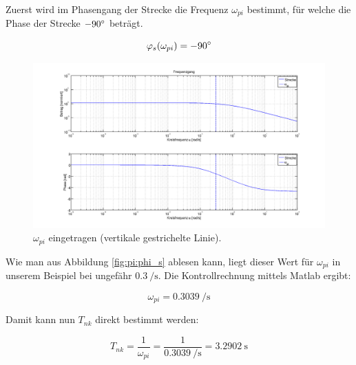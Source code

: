 Zuerst wird im Phasengang der Strecke die Frequenz $\omega_{pi}$ bestimmt, f\"ur
welche die Phase der Strecke $-90\degree$ betr\"agt.

\begin{equation} \label{eq:pi:phi_s}
    \varphi_s(\omega_{pi}) = -90 \degree
\end{equation}

\begin{figure}[h! width=\pagewidth]
    \includegraphics[width=\textwidth]{images/piStreckeOmegaPI.png}
    \caption{%
        $\omega_{pi}$ eingetragen (vertikale gestrichelte Linie).
    }
    \label{fig:pi:omega_pi}
\end{figure}

Wie man aus Abbildung \ref{fig:pi:phi_s} ablesen kann, liegt dieser Wert f\"ur
$\omega_{pi}$ in unserem  Beispiel bei ungef\"ahr $\SI{0.3}{\per\second}$. Die
Kontrollrechnung mittels Matlab ergibt:

\begin{equation} \label{eq:pi:omega_pi}
    \omega_{pi} = \SI{0.3039}{\per\second}
\end{equation}

Damit kann nun $T_{nk}$ direkt bestimmt werden\footnotemark[1]:

\begin{equation} \label{eq:pi:omega_pi}
    T_{nk} = \frac{1}{\omega_{pi}} = \frac{1}{\SI{0.3039}{\per\second}} = \SI{3.2902}{\second}
\end{equation}


